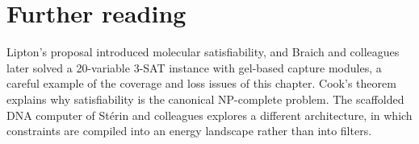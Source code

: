 \section*{Further reading}
Lipton's proposal introduced molecular satisfiability,\cite{Lipton1995} and
Braich and colleagues later solved a 20-variable 3-SAT instance with
gel-based capture modules, a careful example of the coverage and loss issues of
this chapter.\cite{Braich2002} Cook's theorem explains why satisfiability is the
canonical NP-complete problem.\cite{Cook1971} The scaffolded DNA computer of
St\'erin and colleagues explores a different architecture, in which constraints
are compiled into an energy landscape rather than into filters.\cite{Sterin2026}
